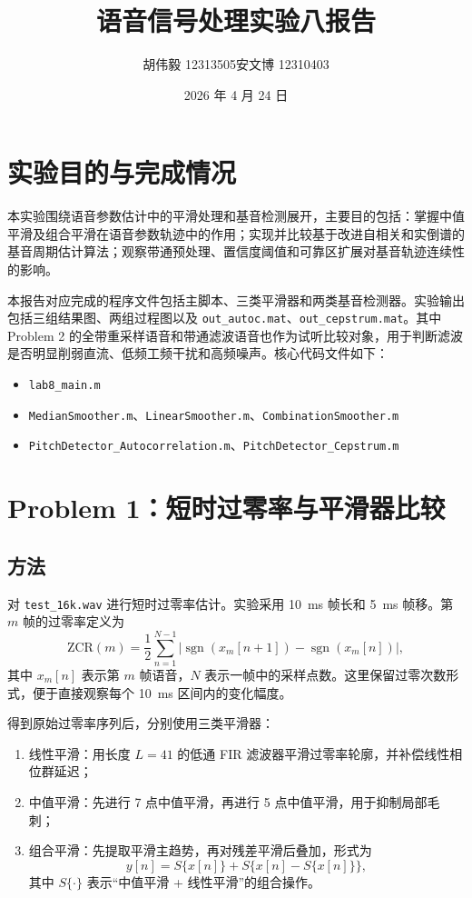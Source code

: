 \documentclass[UTF8,a4paper,12pt,fontset=fandol]{ctexart}
\title{语音信号处理实验八报告}
\author{胡伟毅 12313505\quad 安文博 12310403}
\date{2026 年 4 月 24 日}
\begin{document}
\maketitle

\section{实验目的与完成情况}

本实验围绕语音参数估计中的平滑处理和基音检测展开，主要目的包括：掌握中值平滑及组合平滑在语音参数轨迹中的作用；实现并比较基于改进自相关和实倒谱的基音周期估计算法；观察带通预处理、置信度阈值和可靠区扩展对基音轨迹连续性的影响。

本报告对应完成的程序文件包括主脚本、三类平滑器和两类基音检测器。实验输出包括三组结果图、两组过程图以及 \texttt{out\_autoc.mat}、\texttt{out\_cepstrum.mat}。其中 Problem 2 的全带重采样语音和带通滤波语音也作为试听比较对象，用于判断滤波是否明显削弱直流、低频工频干扰和高频噪声。核心代码文件如下：
\begin{itemize}[noitemsep]
    \item \texttt{lab8\_main.m}
    \item \texttt{MedianSmoother.m}、\texttt{LinearSmoother.m}、\texttt{CombinationSmoother.m}
    \item \texttt{PitchDetector\_Autocorrelation.m}、\texttt{PitchDetector\_Cepstrum.m}
\end{itemize}

\section{Problem 1：短时过零率与平滑器比较}

\subsection{方法}

对 \texttt{test\_16k.wav} 进行短时过零率估计。实验采用 \SI{10}{ms} 帧长和 \SI{5}{ms} 帧移。第 $m$ 帧的过零率定义为
\begin{equation}
    \mathrm{ZCR}(m)=\frac{1}{2}\sum_{n=1}^{N-1}\left|\operatorname{sgn}(x_m[n+1])-\operatorname{sgn}(x_m[n])\right|,
\end{equation}
其中 $x_m[n]$ 表示第 $m$ 帧语音，$N$ 表示一帧中的采样点数。这里保留过零次数形式，便于直接观察每个 \SI{10}{ms} 区间内的变化幅度。

得到原始过零率序列后，分别使用三类平滑器：
\begin{enumerate}[label=(\arabic*)]
    \item 线性平滑：用长度 $L=41$ 的低通 FIR 滤波器平滑过零率轮廓，并补偿线性相位群延迟；
    \item 中值平滑：先进行 7 点中值平滑，再进行 5 点中值平滑，用于抑制局部毛刺；
    \item 组合平滑：先提取平滑主趋势，再对残差平滑后叠加，形式为
    \begin{equation}
        y[n]=S\{x[n]\}+S\{x[n]-S\{x[n]\}\},
    \end{equation}
    其中 $S\{\cdot\}$ 表示“中值平滑 + 线性平滑”的组合操作。
\end{enumerate}
\end{document}
